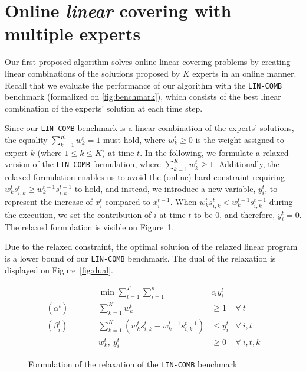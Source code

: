 
\section{Online \emph{linear} covering with multiple experts}	\label{sec:covering}

Our first proposed algorithm solves online linear covering problems by creating linear combinations of the solutions proposed by $K$ experts in an online manner.
Recall that we evaluate the performance of our algorithm with the \texttt{LIN-COMB} benchmark (formalized on \cref{fig:benchmark}), which consists of the best linear combination of the experts' solution at each time step.

Since our \texttt{LIN-COMB} benchmark is a linear combination of the experts' solutions, the equality $ \sum_{k=1}^{K} w_{k}^{t} = 1$ must hold, where $w_{k}^{t} \geq 0$ is the weight assigned to expert $k$ (where $1 \leq k \leq K$) at time $t$. In the following, we formulate a relaxed version of the \texttt{LIN-COMB} formulation, where
$\sum_{k=1}^{K} w_{k}^{t} \geq 1$. Additionally, the relaxed formulation enables us to avoid the (online) hard constraint requiring $w_{k}^{t} s_{i,k}^{t} \geq w_{k}^{t-1} s_{i,k}^{t-1}$ to hold, and instead, we introduce a new variable, $y_{i}^{t}$, to represent the increase of $x_{i}^{t}$ compared to $x_{i}^{t-1}$. When $w_{k}^{t} s_{i,k}^{t} < w_{k}^{t-1} s_{i,k}^{t-1}$ during the execution, we set the contribution of $i$ at time $t$ to be 0, and therefore, $y_{i}^{t} = 0$.
The relaxed formulation is visible on Figure~\ref{fig:relaxation}.

Due to the relaxed constraint, the optimal solution of the relaxed linear program is a lower bound of our \texttt{LIN-COMB} benchmark. The dual of the relaxation is displayed on Figure~\ref{fig:dual}.


\begin{figure}[ht]
	\begin{mdframed}
		\begin{align*}
			&& \min \sum_{t = 1}^{T} \sum_{i=1}^{n} & c_i y_i^t \\
			(\alpha^{t}) \qquad && \sum_{k=1}^{K} w_{k}^{t} & \geq 1  & \forall\ t \\
			(\beta_{i}^{t}) \qquad && \sum_{k=1}^{K} \left(w_{k}^{t} s_{i,k}^{t} - w_{k}^{t-1} s_{i,k}^{t-1} \right) &\leq y_i^t  &\forall\ i,t\\
			&& w_{k}^{t},\ y_{i}^{t} & \ge 0 & \forall\ i,t,k
		\end{align*}
	\end{mdframed}
	\caption{Formulation of the relaxation of the \texttt{LIN-COMB} benchmark}
	\label{fig:relaxation}
\end{figure}


